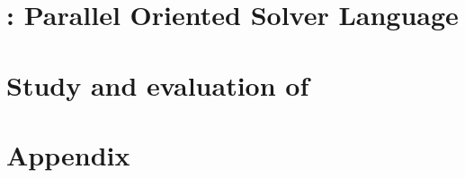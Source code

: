 \documentclass[a4paper,11pt,twoside,parskip=half,numbers=noenddot,bibliography=totocnumbered,listof = totoc]{scrbook}
\begin{document}

\frontmatter
%

\cleardoublepage
%

\cleardoublepage
\dominitoc
%
%
%

\mainmatter

%
%
%
\part{\posl{}: Parallel Oriented Solver Language}

\part{Study and evaluation of \posl}

%
%
%

\footnotesize
{} %

\normalsize

\appendix
%

\part{Appendix}





%
\end{document}
